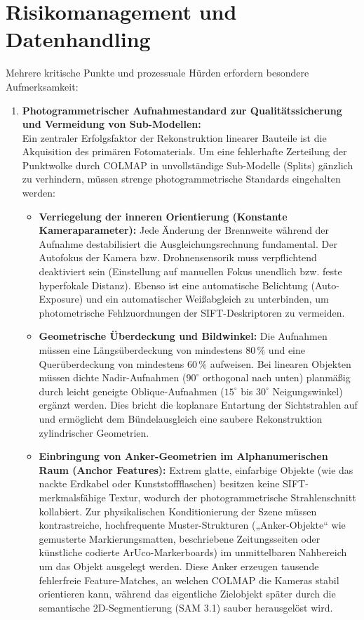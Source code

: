 \documentclass[12pt,a4paper]{article}
\begin{document}
\section{Risikomanagement und Datenhandling}
Mehrere kritische Punkte und prozessuale Hürden erfordern besondere Aufmerksamkeit:
\begin{enumerate}
    \item \textbf{Photogrammetrischer Aufnahmestandard zur Qualitätssicherung und Vermeidung von Sub-Modellen:} \\
          Ein zentraler Erfolgsfaktor der Rekonstruktion linearer Bauteile ist die Akquisition des primären Fotomaterials. Um eine fehlerhafte Zerteilung der Punktwolke durch COLMAP in unvollständige Sub-Modelle (Splits) gänzlich zu verhindern, müssen strenge photogrammetrische Standards eingehalten werden:
          \begin{itemize}[noitemsep]
              \item \textbf{Verriegelung der inneren Orientierung (Konstante Kameraparameter):} Jede Änderung der Brennweite während der Aufnahme destabilisiert die Ausgleichungsrechnung fundamental. Der Autofokus der Kamera bzw. Drohnensensorik muss verpflichtend deaktiviert sein (Einstellung auf manuellen Fokus unendlich bzw. feste hyperfokale Distanz). Ebenso ist eine automatische Belichtung (Auto-Exposure) und ein automatischer Weißabgleich zu unterbinden, um photometrische Fehlzuordnungen der SIFT-Deskriptoren zu vermeiden.
              \item \textbf{Geometrische Überdeckung und Bildwinkel:} Die Aufnahmen müssen eine Längsüberdeckung von mindestens $80\,\%$ und eine Querüberdeckung von mindestens $60\,\%$ aufweisen. Bei linearen Objekten müssen dichte Nadir-Aufnahmen ($90^\circ$ orthogonal nach unten) planmäßig durch leicht geneigte Oblique-Aufnahmen ($15^\circ$ bis $30^\circ$ Neigungswinkel) ergänzt werden. Dies bricht die koplanare Entartung der Sichtstrahlen auf und ermöglicht dem Bündelausgleich eine saubere Rekonstruktion zylindrischer Geometrien.
              \item \textbf{Einbringung von Anker-Geometrien im Alphanumerischen Raum (Anchor Features):} Extrem glatte, einfarbige Objekte (wie das nackte Erdkabel oder Kunststoffflaschen) besitzen keine SIFT-merkmalsfähige Textur, wodurch der photogrammetrische Strahlenschnitt kollabiert. Zur physikalischen Konditionierung der Szene müssen kontrastreiche, hochfrequente Muster-Strukturen („Anker-Objekte“ wie gemusterte Markierungsmatten, beschriebene Zeitungsseiten oder künstliche codierte ArUco-Markerboards) im unmittelbaren Nahbereich um das Objekt ausgelegt werden. Diese Anker erzeugen tausende fehlerfreie Feature-Matches, an welchen COLMAP die Kameras stabil orientieren kann, während das eigentliche Zielobjekt später durch die semantische 2D-Segmentierung (SAM 3.1) sauber herausgelöst wird.

\end{itemize}
\end{enumerate}
\end{document}
